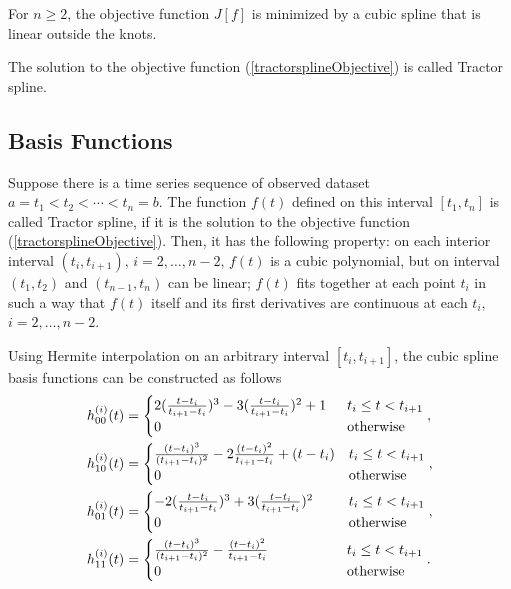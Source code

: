 \begin{theorem}
For $n\geq2$, the objective function $J[f]$ is minimized by a cubic spline that is linear outside the knots.
\end{theorem}
The solution to the objective function (\ref{tractorsplineObjective}) is called Tractor spline.


\subsection{Basis Functions}
Suppose there is a time series sequence of observed dataset $a=t_1<t_2<\cdots<t_n=b$. The function $f(t)$ %
defined on this interval $[t_1,t_n]$ is called Tractor spline, if it is the solution to the objective function (\ref{tractorsplineObjective}). Then, it has the following property: on each interior interval $(t_i,t_{i+1})$, $i=2,\ldots,n-2$, $f(t)$ is a cubic polynomial, but on interval $(t_1,t_2)$ and $(t_{n-1},t_n)$ can be linear; $f(t)$ fits together at each point $t_i$ in such a way that $f(t)$ itself and its first derivatives are continuous at each $t_i$,  $i=2,\ldots,n-2$. 

Using Hermite interpolation on an arbitrary interval $[t_i,t_{i+1}]$, the cubic spline basis functions can be constructed as follows
\begin{align}\label{hermitebasis1}
& h_{00}^{(i)}(t)=
\begin{cases}
2(\frac{t-t_{i}}{t_{i+1}-t_{i}})^3-3(\frac{t-t_{i}}{t_{i+1}-t_{i}})^2+1 \hphantom{1} & t_i\leq t<t_{i+1} \\ 
0 & \mbox{otherwise}
\end{cases}, \\
& h_{10}^{(i)}(t)=\begin{cases}
\frac{(t-t_{i})^3}{(t_{i+1}-t_{i})^2}-2\frac{(t-t_{i})^2}{t_{i+1}-t_{i}}+(t-t_{i})   & t_i\leq t<t_{i+1} \\ 
0 &   \mbox{otherwise}
\end{cases},\\
& h_{01}^{(i)}(t)=
\begin{cases}
-2(\frac{t-t_i}{t_{i+1}-t_i})^3+3(\frac{t-t_i}{t_{i+1}-t_i})^2 \hphantom{+1.} & t_i\leq t<t_{i+1} \\ 
0 &   \mbox{otherwise}
\end{cases},\\
& h_{11}^{(i)}(t)=\begin{cases}
\frac{(t-t_i)^3}{(t_{i+1}-t_i)^2}-\frac{(t-t_i)^2}{t_{i+1}-t_i}  \hphantom{+t-123-}  & t_i\leq t<t_{i+1} \\ 
0 &   \mbox{otherwise}
\end{cases}.
\end{align}

